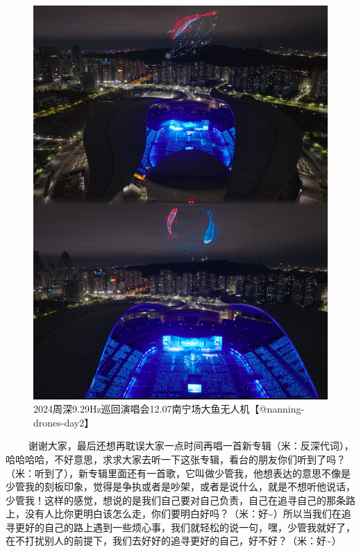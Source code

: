 \documentclass[]{ctexbook}
\begin{document}
\begin{figure}

{\centering \includegraphics[width=400pt]{img/nanning20241207/003} 

}

\caption{2024周深9.29Hz巡回演唱会12.07南宁场大鱼无人机【@nanning-drones-day2】}\label{fig:unnamed-chunk-166}
\end{figure}

   谢谢大家，最后还想再耽误大家一点时间再唱一首新专辑（米：反深代词），哈哈哈哈，不好意思，求求大家去听一下这张专辑，看台的朋友你们听到了吗？（米：听到了），新专辑里面还有一首歌，它叫做少管我，他想表达的意思不像是少管我的刻板印象，觉得是争执或者是吵架，或者是说什么，就是不想听他说话，少管我！这样的感觉，想说的是我们自己要对自己负责，自己在追寻自己的那条路上，没有人比你更明白该怎么走，你们要明白好吗？（米：好\textasciitilde）所以当我们在追寻更好的自己的路上遇到一些烦心事，我们就轻松的说一句，嘿，少管我就好了，在不打扰别人的前提下，我们去好好的追寻更好的自己，好不好？（米：好\textasciitilde）
\end{document}
